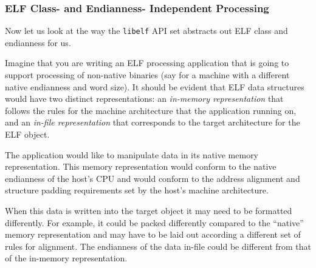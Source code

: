 \documentclass[a4paper,pdftex]{book}
\newcommand{\firstterm}[1]{\textit{#1}}
\newcommand{\library}[1]{\texttt{#1}}
\begin{document}
\subsubsection{ELF Class- and Endianness- Independent Processing}
Now let us look at the way the \library{libelf} API set abstracts out
ELF class and endianness for us.

Imagine that you are writing an ELF processing application that is
going to support processing of non-native binaries (say for a machine
with a different native endianness and word size).  It should be
evident that ELF data structures would have two distinct
representations:  an
\firstterm{in-memory representation} that follows the rules for the
machine architecture that the application running on, and an
\firstterm{in-file representation} that corresponds to the target
architecture for the ELF object.

The application would like to manipulate data in its native memory
representation.  This memory
representation would conform to the native endianness of the host's
CPU and would conform to the address alignment and structure padding
requirements set by the host's machine architecture.

 When this data is written into
the target object it may need to be formatted differently.  For
example, it could be packed differently compared to the ``native''
memory representation and may have to be laid out according a
different set of rules for alignment.  The endianness of the data
in-file could be different from that of the in-memory representation.
\end{document}
